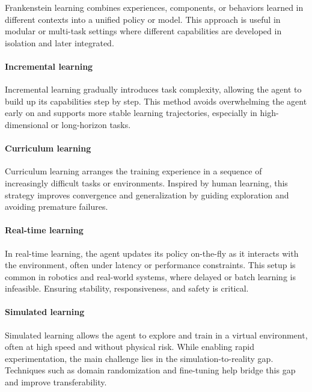 Frankenstein learning combines experiences, components, or behaviors learned in different contexts into a unified policy or model. This approach is useful in modular or multi-task settings where different capabilities are developed in isolation and later integrated.

\paragraph{Incremental learning}

Incremental learning gradually introduces task complexity, allowing the agent to build up its capabilities step by step. This method avoids overwhelming the agent early on and supports more stable learning trajectories, especially in high-dimensional or long-horizon tasks.

\paragraph{Curriculum learning}

Curriculum learning arranges the training experience in a sequence of increasingly difficult tasks or environments. Inspired by human learning, this strategy improves convergence and generalization by guiding exploration and avoiding premature failures.

\paragraph{Real-time learning}

In real-time learning, the agent updates its policy on-the-fly as it interacts with the environment, often under latency or performance constraints. This setup is common in robotics and real-world systems, where delayed or batch learning is infeasible. Ensuring stability, responsiveness, and safety is critical.

\paragraph{Simulated learning}

Simulated learning allows the agent to explore and train in a virtual environment, often at high speed and without physical risk. While enabling rapid experimentation, the main challenge lies in the simulation-to-reality gap. Techniques such as domain randomization and fine-tuning help bridge this gap and improve transferability.
